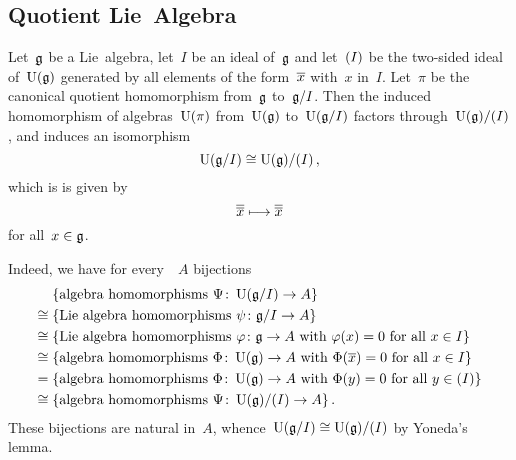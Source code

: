 \subsection{Quotient Lie~Algebra}


\begin{example}
  Let~$\mathfrak{g}$ be a Lie~algebra, let~$I$ be an ideal of~$\mathfrak{g}$ and let~$\lparen I\rparen$ be the two-sided ideal of~$\operatorname{U}(\mathfrak{g})$ generated by all elements of the form~$\overline{x}$ with~$x$ in~$I$.
  Let~$\pi$ be the canonical quotient homomorphism from~$\mathfrak{g}$ to~$\mathfrak{g}/I$.
  Then the induced homomorphism of algebras~$\operatorname{U}(\pi)$ from~$\operatorname{U}(\mathfrak{g})$ to~$\operatorname{U}(\mathfrak{g}/I)$ factors through~$\operatorname{U}(\mathfrak{g}) / \lparen I\rparen$, and induces an isomorphism
  \[
    \operatorname{U}(\mathfrak{g}/I)
    \cong
    \operatorname{U}(\mathfrak{g}) / \lparen I\rparen \,,
  \]
  which is is given by
  \[
    \class{ \class{x} }
    \mapsto
    \class{ \class{x} }
  \]
  for all~$x \in \mathfrak{g}$.

  Indeed, we have for every~{\algebra{$\kf$}}~$A$ bijections
  \begin{align*}
    {}&
    \{ \textstyle\text{algebra homomorphisms~$\Psi \colon \Univ(\glie/I) \to A$} \}
    \\
    \cong{}&
    \{ \textstyle\text{Lie~algebra homomorphisms~$\psi \colon \glie/I \to A$} \}
    \\
    \cong{}&
    \{ \textstyle\text{Lie~algebra homomorphisms~$\varphi \colon \glie \to A$ with~$\varphi(x) = 0$ for all~$x \in I$} \}
    \\
    \cong{}&
    \{ \textstyle\text{algebra homomorphisms~$\Phi \colon \Univ(\glie) \to A$ with~$\Phi(\class{x}) = 0$ for all~$x \in I$} \}
    \\
    ={}&
    \{ \textstyle\text{algebra homomorphisms~$\Phi \colon \Univ(\glie) \to A$ with~$\Phi(y) = 0$ for all~$y \in \ideal{I}$} \}
    \\
    \cong{}&
    \{ \textstyle\text{algebra homomorphisms~$\Psi \colon \Univ(\glie) / \ideal{I} \to A$} \} \,.
  \end{align*}
  These bijections are natural in~$A$, whence~$\operatorname{U}(\mathfrak{g}/I) \cong \operatorname{U}(\mathfrak{g}) / \lparen I\rparen$ by Yoneda’s lemma.
  

\end{example}
